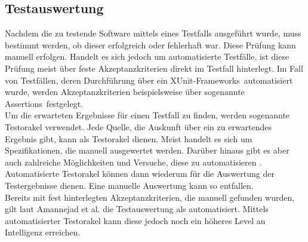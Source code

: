 \subsection{Testauswertung}
\label{subsec:testauswertung}
Nachdem die zu testende Software mittels eines Testfalls ausgeführt wurde, muss bestimmt werden, ob dieser erfolgreich oder fehlerhaft war. Diese Prüfung kann manuell erfolgen. Handelt es sich jedoch um automatisierte Testfälle, ist diese Prüfung meist über feste Akzeptanzkriterien direkt im Testfall hinterlegt. Im Fall von Testfällen, deren Durchführung über ein \grq XUnit-Frameworks\grq\ automatisiert wurde, werden Akzeptanzkriterien beispielsweise über sogenannte \grq Assertions\grq\ festgelegt.\\
Um die erwarteten Ergebnisse für einen Testfall zu finden, werden sogenannte Testorakel verwendet.
Jede Quelle, die Auskunft über ein zu erwartendes Ergebnis gibt, kann als Testorakel dienen.
Meist handelt es sich um Spezifikationen, die manuell ausgewertet werden.
Darüber hinaus gibt es aber auch zahlreiche Möglichkeiten und Versuche, diese zu automatisieren \cite{memon_automated_2000} \cite{richardson_specification-based_1992} \cite{shahamiri_comparative_2009}.
Automatisierte Testorakel können dann wiederum für die Auswertung der Testergebnisse dienen. Eine manuelle Auswertung kann so entfallen.\\
Bereits mit fest hinterlegten Akzeptanzkriterien, die manuell gefunden wurden, gilt laut Amannejad et al. \cite{amannejad_search-based_2014} die Testauswertung als automatisiert. Mittels automatisierter Testorakel kann diese jedoch noch ein höheres Level an Intelligenz erreichen. 




